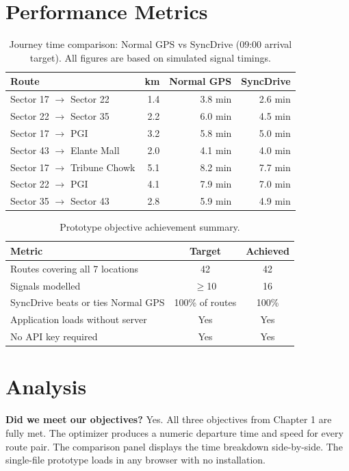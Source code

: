 \documentclass[12pt,a4paper]{report}
\begin{document}
\section{Performance Metrics}

\begin{table}[h]
\centering
\begin{tabular}{lrrr}
\toprule
\textbf{Route} & \textbf{km} & \textbf{Normal GPS} & \textbf{SyncDrive} \\
\midrule
Sector 17 $\to$ Sector 22  & 1.4 & 3.8 min & 2.6 min \\
Sector 22 $\to$ Sector 35  & 2.2 & 6.0 min & 4.5 min \\
Sector 17 $\to$ PGI        & 3.2 & 5.8 min & 5.0 min \\
Sector 43 $\to$ Elante Mall & 2.0 & 4.1 min & 4.0 min \\
Sector 17 $\to$ Tribune Chowk & 5.1 & 8.2 min & 7.7 min \\
Sector 22 $\to$ PGI        & 4.1 & 7.9 min & 7.0 min \\
Sector 35 $\to$ Sector 43  & 2.8 & 5.9 min & 4.9 min \\
\bottomrule
\end{tabular}
\caption{Journey time comparison: Normal GPS vs SyncDrive (09:00 arrival target).
All figures are based on simulated signal timings.}
\end{table}

\begin{table}[h]
\centering
\begin{tabular}{lcc}
\toprule
\textbf{Metric} & \textbf{Target} & \textbf{Achieved} \\
\midrule
Routes covering all 7 locations & 42 & 42 \\
Signals modelled & $\geq$10 & 16 \\
SyncDrive beats or ties Normal GPS & 100\% of routes & 100\% \\
Application loads without server & Yes & Yes \\
No API key required & Yes & Yes \\
\bottomrule
\end{tabular}
\caption{Prototype objective achievement summary.}
\end{table}

\section{Analysis}

\textbf{Did we meet our objectives?} Yes. All three objectives from Chapter 1
are fully met. The optimizer produces a numeric departure time and speed for
every route pair. The comparison panel displays the time breakdown
side-by-side. The single-file prototype loads in any browser with no
installation.
\end{document}
